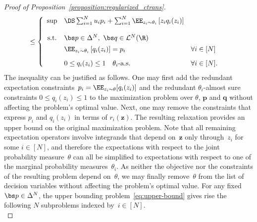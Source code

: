 \documentclass[11pt, a4paper, oneside, reqno]{article}
\begin{document}
\begin{proof}[Proof of Proposition~\ref{proposition:regularized_ctrans}]
\begin{align}
	&\leq \left\{
	\begin{array}{cll}
	\sup & \DS \sum_{i=1}^N u_i p_i + \sum_{i=1}^N \EE_{z_i \sim \theta_i} \left[ z_i q_i(z_i) \right] \\[3ex]
	\text{s.t.} & \bs p \in \Delta^N,~ \bs q \in \mathcal L^N(\R) \\ [1ex]
	& \EE_{z_i \sim \theta_i} \left[ q_i(z_i) \right] = p_i & \forall i \in [N] \\[2ex]
	& 0 \leq q_i(z_i) \leq 1 \quad \theta_i\text{-a.s.} & \forall i \in [N].
	\end{array} \right.
	\label{eq:upper-bound}
	\end{align}
	The inequality can be justified as follows. One may first add the redundant expectation constraints~$p_i = \EE_{z_i \sim \theta} [q_i(z_i)]$ and the redundant $\theta_i$-almost sure constraints $0\leq q_i(z_i)\leq 1$ to the maximization problem over $
	\theta$, $\bm p$ and $\bm q$ without affecting the problem's optimal value. Next, one may remove the constraints that express $p_i$ and $q_i(z_i)$ in terms of $r_i(\bm z)$. The resulting relaxation provides an upper bound on the original maximization problem. Note that all remaining expectation operators involve integrands that depend on~$\bm z$ only through~$z_i$ for some $i\in[N]$, and therefore the expectations with respect to the joint probability measure~$\theta$ can all be simplified to expectations with respect to one of the marginal probability measures~$\theta_i$. As neither the objective nor the constraints of the resulting problem depend on~$\theta$, we may finally remove~$\theta$ from the list of decision variables without affecting the problem's optimal value. 
	For any fixed $\bs p \in \Delta^N$, the upper bounding problem~\eqref{eq:upper-bound} gives rise the following $N$ subproblems indexed by~$i\in[N]$.
	\begin{subequations}

\end{subequations}
\end{proof}
\end{document}
